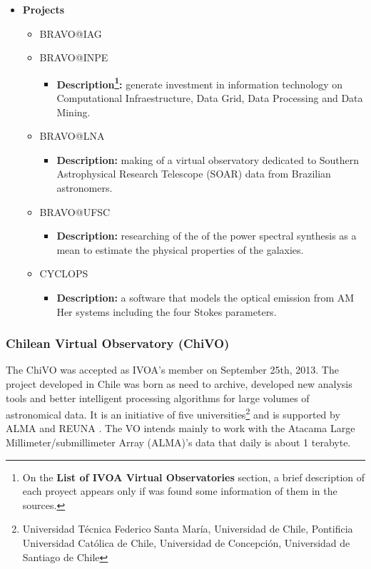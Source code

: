 \begin{itemize}
\item \textbf{Projects}
\begin{itemize}
\item BRAVO@IAG
\item BRAVO@INPE
\begin{itemize}
\item \textbf{Description\footnote{On the \textbf{List of IVOA Virtual
Observatories} section, a brief description of each proyect appears only if was
found some information of them in the sources.}:} generate investment in
information technology on Computational Infraestructure, Data Grid, Data
Processing and Data Mining.
\end{itemize}
\item BRAVO@LNA
\begin{itemize}
\item \textbf{Description:} making of a virtual observatory dedicated to
Southern Astrophysical Research Telescope (SOAR) data from Brazilian
astronomers.  
\end{itemize}
\item BRAVO@UFSC
\begin{itemize}
\item \textbf{Description:} researching of the of the power spectral synthesis
as a mean to estimate the physical properties of the galaxies.
\end{itemize}
\item CYCLOPS
\begin{itemize}
\item \textbf{Description:} a software that models the optical emission from AM
Her systems including the four Stokes parameters.
\end{itemize}
\end{itemize}
\end{itemize}

\subsubsection{Chilean Virtual Observatory (ChiVO)}
The ChiVO \cite{website:chivo-home} was accepted as IVOA's member on September
25th, 2013. The project developed in Chile was born as need to archive,
developed new analysis tools and better intelligent processing algorithms for
large volumes of astronomical data. It is an initiative of five
universities\footnote{Universidad T\'{e}cnica Federico Santa Mar\'{i}a,
Universidad de Chile, Pontificia Universidad Cat\'{o}lica de Chile, Universidad
de Concepci\'{o}n, Universidad de Santiago de Chile} and is supported by ALMA
\cite{webiste:alma-home} and REUNA \cite{website:reuna-home}. The VO intends
mainly to work with the Atacama Large Millimeter/submillimeter Array (ALMA)'s
data that daily is about 1 terabyte.

